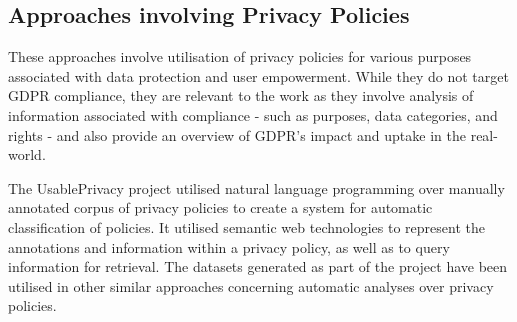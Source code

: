 \subsection{Approaches involving Privacy Policies}
These approaches involve utilisation of privacy policies for various purposes associated with data protection and user empowerment. While they do not target GDPR compliance, they are relevant to the work as they involve analysis of information associated with compliance - such as purposes, data categories, and rights - and also provide an overview of GDPR's impact and uptake in the real-world.

The UsablePrivacy project \cite{sadeh_usable_2013} utilised natural language programming over manually annotated corpus of privacy policies to create a system for automatic classification of policies. 
It utilised semantic web technologies \cite{oltramari_privonto:_2018} to represent the annotations and information within a privacy policy, as well as to query information for retrieval.
The datasets generated as part of the project have been utilised in other similar approaches \cite{harkous_polisis:_2018,linden_privacy_2018} concerning automatic analyses over privacy policies. 

